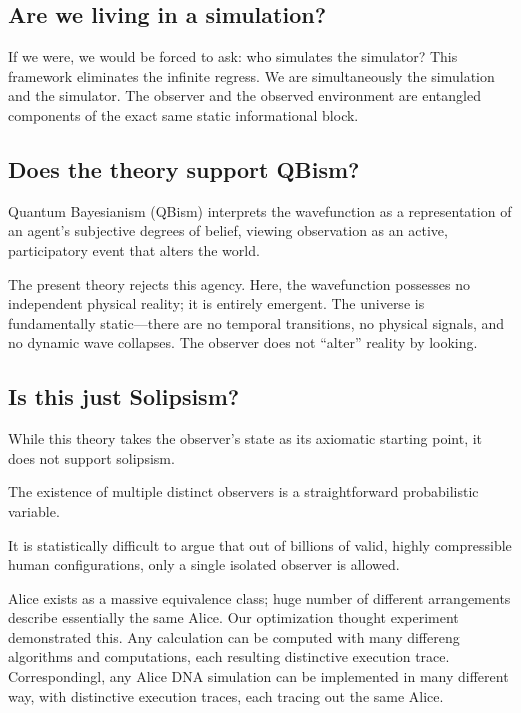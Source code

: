 \subsection*{Are we living in a simulation?}

If we were, we would be forced to ask: who simulates the simulator? This framework eliminates the infinite regress.
We are simultaneously the simulation and the simulator.
The observer and the observed environment are entangled components of the exact same static informational block.


\subsection*{Does the theory support QBism?}

Quantum Bayesianism (QBism) interprets the wavefunction as a representation of an agent’s subjective degrees of belief,
viewing observation as an active, participatory event that alters the world.

The present theory rejects this agency. Here, the wavefunction possesses no independent physical reality; it is entirely emergent.
The universe is fundamentally static—there are no temporal transitions, no physical signals, and no dynamic wave collapses.
The observer does not ``alter'' reality by looking.


\subsection*{Is this just Solipsism?}

While this theory takes the observer's state as its axiomatic starting point, it does not support solipsism.

The existence of multiple distinct observers is a straightforward probabilistic variable.

It is statistically difficult to argue that out of billions of valid, highly compressible human configurations, only a single isolated observer is allowed.

Alice exists as a massive equivalence class; huge number of different arrangements describe essentially the same Alice. Our optimization thought experiment
demonstrated this. Any calculation can be computed with many differeng algorithms and computations, each resulting distinctive execution trace.
Correspondingl, any Alice DNA simulation can be implemented in many different way, with distinctive execution traces, each tracing out the same Alice.

